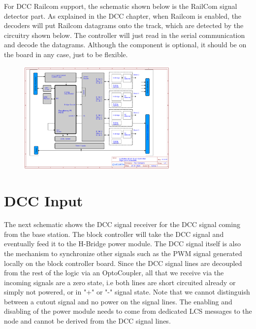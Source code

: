 For DCC Railcom support, the schematic shown below is the RailCom signal detector part. As explained in the DCC chapter, when Railcom is enabled, the decoders will put Railcom datagrams onto the track, which are detected by the circuitry shown below. The controller will just read in the serial communication and decode the datagrams. Although the component is optional, it should be on the board in any case, just to be flexible.

\begin{figure}[htbp]
    \centering
    \includegraphics[page=5, width=0.7\textwidth]{./Schematics/Schematic_LcsNodes-Block-Quad-Controller.pdf}
\end{figure}
\FloatBarrier

\section{DCC Input}

The next schematic shows the DCC signal receiver for the DCC signal coming from the base station. The block controller will take the DCC signal and eventually feed it to the H-Bridge power module. The DCC signal itself is also the mechanism to synchronize other signals such as the PWM signal generated locally on the block controller board. Since the DCC signal lines are decoupled from the rest of the logic via an OptoCoupler, all that we receive via the incoming signals are a zero state, i.e both lines are short circuited already or simply not powered, or in "+" or "-" signal state. Note that we cannot distinguish between a cutout signal and no power on the signal lines. The enabling and disabling of the power module needs to come from dedicated LCS messages to the node and cannot be derived from the DCC signal lines.

